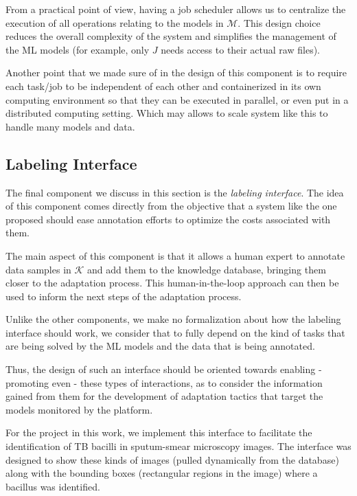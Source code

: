 \documentclass[../main.tex]{subfiles}
\begin{document}
     From a practical point of view, having a job scheduler allows us to centralize the execution of all operations relating to the models in $\mathcal{M}$. This design choice reduces the overall complexity of the system and simplifies the management of the ML models (for example, only $J$ needs access to their actual raw files).

     Another point that we made sure of in the design of this component is to require each task/job to be independent of each other and containerized in its own computing environment so that they can be executed in parallel, or even put in a distributed computing setting. Which may allows to scale system like this to handle many models and data.
    

   \subsection{Labeling Interface} \label{sec:labeling_interface}

   The final component we discuss in this section is the \textit{labeling interface}. The idea of this component comes directly from the objective that a system like the one proposed should ease annotation efforts to optimize the costs associated with them.  

   The main aspect of this component is that it allows a human expert to annotate data samples in $\mathcal{K}$ and add them to the knowledge database, bringing them closer to the adaptation process.
   This human-in-the-loop approach can then be used to inform the next steps of the adaptation process.   
   
   Unlike the other components, we make no formalization about how the labeling interface should work, we consider that to fully depend on the kind of tasks that are being solved by the ML models and the data that is being annotated. 
   
   Thus, the design of such an interface should be oriented towards enabling - promoting even - these types of interactions, as to consider the information gained from them for the development of adaptation tactics that target the models monitored by the platform. 
   
   For the project in this work, we implement this interface to facilitate the identification of TB bacilli in sputum-smear microscopy images. The interface was designed to show these kinds of images (pulled dynamically from the database) along with the bounding boxes (rectangular regions in the image) where a bacillus was identified.
\end{document}
